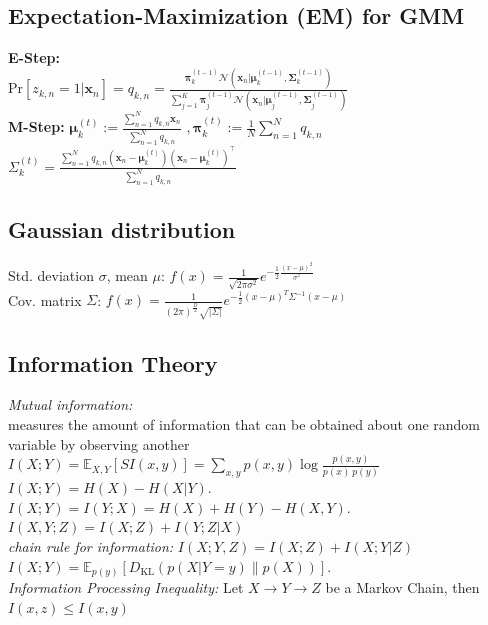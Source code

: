 \documentclass[9pt,parskip]{scrartcl}
\begin{document}
\begin{multicols*}{4}
\subsection*{Expectation-Maximization (EM) for GMM}
\textbf{E-Step: }\\
Pr$[z_{k,n} = 1 | \mathbf{x}_n] = q_{k, n} = \frac{\boldsymbol{\pi}_k^{(t-1)} \mathcal{N}(\mathbf{x}_n | \boldsymbol{\mu}_k^{(t-1)}, \boldsymbol{\Sigma}_k^{(t-1)})}{\sum_{j=1}^K \boldsymbol{\pi}_j^{(t-1)} \mathcal{N}(\mathbf{x}_n | \boldsymbol{\mu}_j^{(t-1)}, \boldsymbol{\Sigma}_j^{(t-1)})}$\\
\textbf{M-Step: } $\boldsymbol{\mu}_k^{(t)} := \frac{\sum_{n=1}^N q_{k,n} \mathbf{x}_n}{\sum_{n=1}^N q_{k,n}}$
$, \boldsymbol{\pi}_k^{(t)} := \frac{1}{N} \sum_{n=1}^N q_{k,n}$\\
$\Sigma_k^{(t)} = \frac{\sum_{n=1}^N q_{k, n} (\mathbf{x}_n - \boldsymbol{\mu}_k^{(t)})(\mathbf{x}_n - \boldsymbol{\mu}_k^{(t)})^\top}{\sum_{n=1}^N q_{k,n}}$

\subsection*{Gaussian distribution}
Std. deviation $\sigma$, mean $\mu$: 
$f(x) = \frac{1}{\sqrt{2\pi \sigma^2}} e^{- \frac{1}{2} \frac{(x-\mu)^2}{\sigma^2}}$\\
Cov. matrix $\Sigma$: 
$f(x) = \frac{1}{(2\pi)^\frac{D}{2} \sqrt{|\Sigma|}} e^{- \frac{1}{2} (x-\mu)^T \Sigma^{-1} (x-\mu)}$



\subsection*{Information Theory}
\textit{Mutual information: } \\
measures the amount of information that can be obtained about one random variable by observing another \\
$I(X;Y)=\mathbb {E} _{X,Y}[SI(x,y)]=\sum _{x,y}p(x,y)\log {\frac {p(x,y)}{p(x)\,p(y)}}$ \\
$I(X;Y)=H(X)-H(X|Y).\,$ \\
$I(X;Y)=I(Y;X)=H(X)+H(Y)-H(X,Y).\,$ \\
$I(X,Y;Z) = I(X;Z) + I(Y;Z|X)$\\
\textit{chain rule for information: }$I(X;Y,Z)=I(X;Z)+I(X;Y|Z)$ \\
$I(X;Y)=\mathbb {E} _{p(y)}[D_{\mathrm {KL} }(p(X|Y=y)\|p(X))].$ \\
\textit{Information Processing Inequality: } Let $X \rightarrow Y \rightarrow Z$ be a Markov Chain, then $I(x,z) \leq I(x,y)$

\end{multicols*}
\end{document}
